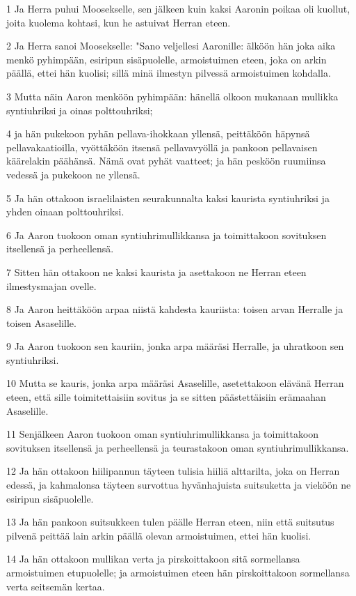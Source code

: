 \par 1 Ja Herra puhui Moosekselle, sen jälkeen kuin kaksi Aaronin poikaa oli kuollut, joita kuolema kohtasi, kun he astuivat Herran eteen.
\par 2 Ja Herra sanoi Moosekselle: "Sano veljellesi Aaronille: älköön hän joka aika menkö pyhimpään, esiripun sisäpuolelle, armoistuimen eteen, joka on arkin päällä, ettei hän kuolisi; sillä minä ilmestyn pilvessä armoistuimen kohdalla.
\par 3 Mutta näin Aaron menköön pyhimpään: hänellä olkoon mukanaan mullikka syntiuhriksi ja oinas polttouhriksi;
\par 4 ja hän pukekoon pyhän pellava-ihokkaan yllensä, peittäköön häpynsä pellavakaatioilla, vyöttäköön itsensä pellavavyöllä ja pankoon pellavaisen käärelakin päähänsä. Nämä ovat pyhät vaatteet; ja hän pesköön ruumiinsa vedessä ja pukekoon ne yllensä.
\par 5 Ja hän ottakoon israelilaisten seurakunnalta kaksi kaurista syntiuhriksi ja yhden oinaan polttouhriksi.
\par 6 Ja Aaron tuokoon oman syntiuhrimullikkansa ja toimittakoon sovituksen itsellensä ja perheellensä.
\par 7 Sitten hän ottakoon ne kaksi kaurista ja asettakoon ne Herran eteen ilmestysmajan ovelle.
\par 8 Ja Aaron heittäköön arpaa niistä kahdesta kauriista: toisen arvan Herralle ja toisen Asaselille.
\par 9 Ja Aaron tuokoon sen kauriin, jonka arpa määräsi Herralle, ja uhratkoon sen syntiuhriksi.
\par 10 Mutta se kauris, jonka arpa määräsi Asaselille, asetettakoon elävänä Herran eteen, että sille toimitettaisiin sovitus ja se sitten päästettäisiin erämaahan Asaselille.
\par 11 Senjälkeen Aaron tuokoon oman syntiuhrimullikkansa ja toimittakoon sovituksen itsellensä ja perheellensä ja teurastakoon oman syntiuhrimullikkansa.
\par 12 Ja hän ottakoon hiilipannun täyteen tulisia hiiliä alttarilta, joka on Herran edessä, ja kahmalonsa täyteen survottua hyvänhajuista suitsuketta ja vieköön ne esiripun sisäpuolelle.
\par 13 Ja hän pankoon suitsukkeen tulen päälle Herran eteen, niin että suitsutus pilvenä peittää lain arkin päällä olevan armoistuimen, ettei hän kuolisi.
\par 14 Ja hän ottakoon mullikan verta ja pirskoittakoon sitä sormellansa armoistuimen etupuolelle; ja armoistuimen eteen hän pirskoittakoon sormellansa verta seitsemän kertaa.
